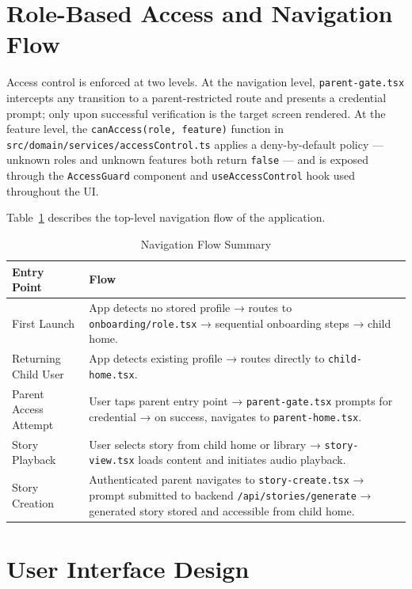 \section{Role-Based Access and Navigation Flow}

Access control is enforced at two levels. At the navigation level, \texttt{parent-gate.tsx} intercepts any transition to a parent-restricted route and presents a credential prompt; only upon successful verification is the target screen rendered. At the feature level, the \texttt{canAccess(role, feature)} function in \texttt{src/domain/services/accessControl.ts} applies a deny-by-default policy — unknown roles and unknown features both return \texttt{false} — and is exposed through the \texttt{AccessGuard} component and \texttt{useAccessControl} hook used throughout the UI.

Table~\ref{fig:nav_flow} describes the top-level navigation flow of the application.

\begin{table}[H]
\centering
\caption{Navigation Flow Summary}
\label{fig:nav_flow}
\renewcommand{\arraystretch}{1.5}
\begin{tabularx}{\textwidth}{|>{\RaggedRight\arraybackslash}p{4cm}|>{\RaggedRight\arraybackslash}X|}
\hline
\textbf{Entry Point} & \textbf{Flow} \\
\hline
First Launch & App detects no stored profile → routes to \texttt{onboarding/role.tsx} → sequential onboarding steps → child home. \\
\hline
Returning Child User & App detects existing profile → routes directly to \texttt{child-home.tsx}. \\
\hline
Parent Access Attempt & User taps parent entry point → \texttt{parent-gate.tsx} prompts for credential → on success, navigates to \texttt{parent-home.tsx}. \\
\hline
Story Playback & User selects story from child home or library → \texttt{story-view.tsx} loads content and initiates audio playback. \\
\hline
Story Creation & Authenticated parent navigates to \texttt{story-create.tsx} → prompt submitted to backend \texttt{/api/stories/generate} → generated story stored and accessible from child home. \\
\hline
\end{tabularx}
\end{table}

\section{User Interface Design}

